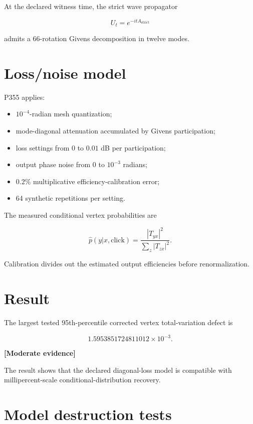 \documentclass[11pt,a4paper,openany]{report}
\newcommand{\statusModerate}{\textcolor{finviolet}{[Moderate evidence]}}
\begin{document}
At the declared witness time, the strict wave propagator

\[
U_t=e^{-itA_{\mathrm{strict}}}
\]

admits a 66-rotation Givens decomposition in twelve modes.

\section{Loss/\allowbreak{}noise model}

P355 applies:

\begin{itemize}
\item 
\(10^{-4}\)-radian mesh quantization;

\item 
mode-diagonal attenuation accumulated by Givens participation;

\item 
loss settings from \(0\) to \(0.01\) dB per participation;

\item 
output phase noise from \(0\) to \(10^{-3}\) radians;

\item 
\(0.2\%\) multiplicative efficiency-calibration error;

\item 
64 synthetic repetitions per setting.

\end{itemize}

The measured conditional vertex probabilities are

\[
\widehat p(y|x,\mathrm{click})
=
\frac{|T_{yx}|^2}
{\sum_z|T_{zx}|^2}.
\]

Calibration divides out the estimated output efficiencies before renormalization.

\section{Result}

The largest tested 95th-percentile corrected vertex total-variation defect is

\[
1.5953851724811012\times10^{-3}.
\]

\textbf{\statusModerate{}}

The result shows that the declared diagonal-loss model is compatible with millipercent-scale conditional-distribution recovery.

\section{Model destruction tests}
\end{document}
